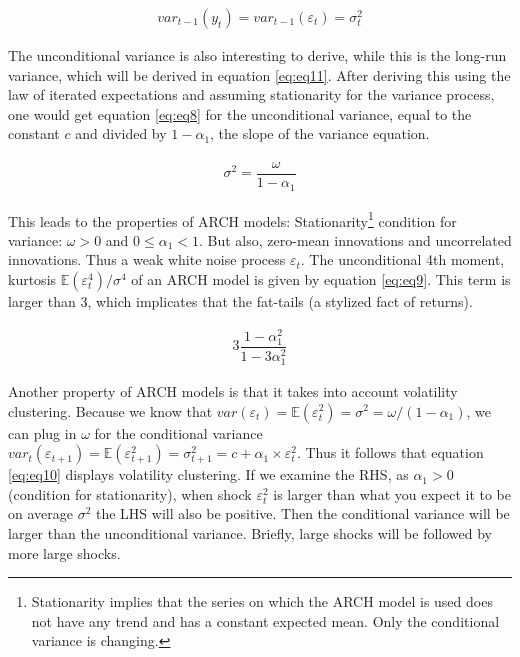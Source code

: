 \documentclass[a4paper, twoside]{templates/ociamthesis}
\begin{document}
\begin{align} 
var_{t-1}(y_t) = var_{t-1}(\varepsilon_t)= \sigma_t^2
 \label{eq:eq7}
\end{align}

\noindent The unconditional variance is also interesting to derive, while this is the long-run variance, which will be derived in equation \eqref{eq:eq11}. After deriving this using the law of iterated expectations and assuming stationarity for the variance process, one would get equation \eqref{eq:eq8} for the unconditional variance, equal to the constant \(c\) and divided by \(1-\alpha_1\), the slope of the variance equation.

\begin{align} 
\sigma^2 = \dfrac{\omega}{1-\alpha_1}
 \label{eq:eq8}
\end{align}

\noindent This leads to the properties of ARCH models: Stationarity\footnote{Stationarity implies that the series on which the ARCH model is used does not have any trend and has a constant expected mean. Only the conditional variance is changing.} condition for variance: \(\omega>0\) and \(0 \le \alpha_1 < 1\). But also, zero-mean innovations and uncorrelated innovations. Thus a weak white noise process \(\varepsilon_t\). The unconditional 4th moment, kurtosis \(\mathbb{E}(\varepsilon_t^4)/\sigma^4\) of an ARCH model is given by equation \eqref{eq:eq9}. This term is larger than 3, which implicates that the fat-tails (a stylized fact of returns).

\begin{align} 
3\dfrac{1-\alpha_1^2}{1-3\alpha_1^2}
 \label{eq:eq9}
\end{align}

\noindent Another property of ARCH models is that it takes into account volatility clustering. Because we know that \(var(\varepsilon_t) = \mathbb{E}(\varepsilon_t^2) = \sigma^2 = \omega/(1-\alpha_1)\), we can plug in \(\omega\) for the conditional variance \(var_t(\varepsilon_{t+1}) = \mathbb{E}(\varepsilon_{t+1}^2) = \sigma_{t+1}^2 = c + \alpha_1\times\varepsilon_t^2\). Thus it follows that equation \eqref{eq:eq10} displays volatility clustering. If we examine the RHS, as \(\alpha_1>0\) (condition for stationarity), when shock \(\varepsilon_t^2\) is larger than what you expect it to be on average \(\sigma^2\) the LHS will also be positive. Then the conditional variance will be larger than the unconditional variance. Briefly, large shocks will be followed by more large shocks.
\end{document}
